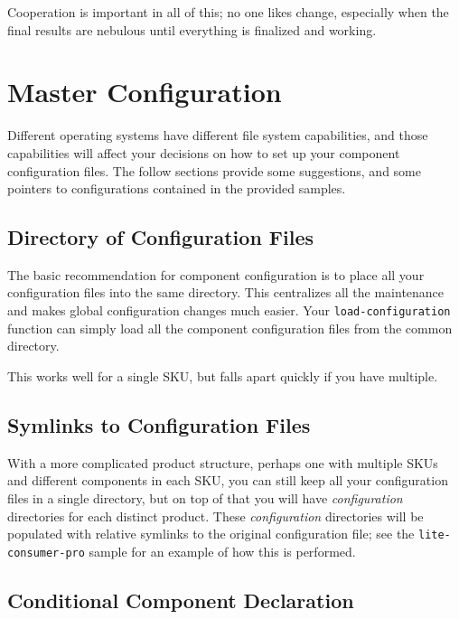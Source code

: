 Cooperation is important in all of this; no one likes change,
especially when the final results are nebulous until everything is
finalized and working.

\section{Master Configuration}\label{wrap:master-configuration}
\label{wrap:techniques}

Different operating systems have different file system capabilities,
and those capabilities will affect your decisions on how to set up
your component configuration files.  The follow sections provide some
suggestions, and some pointers to configurations contained in the
provided \lmsbw samples.

\subsection{Directory of Configuration Files}\label{wrap:directory}

The basic recommendation for \lmsbw component configuration is to
place all your configuration files into the same directory.  This
centralizes all the maintenance and makes global configuration changes
much easier.  Your \texttt{load-configuration} function can simply
load all the component configuration files from the common directory.

This works well for a single SKU, but falls apart quickly if you have
multiple.

\subsection{Symlinks to Configuration Files}

With a more complicated product structure, perhaps one with multiple
SKUs and different components in each SKU, you can still keep all your
configuration files in a single directory, but on top of that you will
have \emph{configuration} directories for each distinct product.
These \emph{configuration} directories will be populated with relative
symlinks to the original configuration file; see the
\texttt{lite-consumer-pro} sample for an example of how this is
performed.

\subsection{Conditional Component Declaration}

